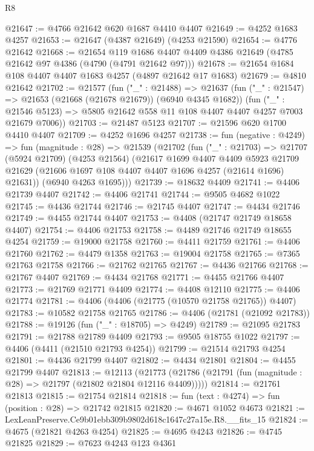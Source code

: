 \begin{lexlean}{R8}
\begin{coremodule}
@21647 := @4766 @21642 @620 @1687 @4410 @4407
@21649 := @4252 @1683 @4257
@21653 := @21647 (@4387 @21649) (@4253 @21590)
@21654 := @4776 @21642
@21668 := @21654
    @119
    @1686
    @4407
    @4409
    @4386
    @21649
    (@4785 @21642 @97 @4386 (@4790 (@4791 @21642 @97)))
@21678 := @21654 @1684 @108 @4407 @4407 @1683 @4257 (@4897 @21642 @17 @1683)
@21679 := @4810 @21642
@21702 := @21577
    (fun ("_" : @21488) =>
    @21637
      (fun ("_" : @21547) => @21653 (@21668 (@21678 @21679)) (@6940 @4345 @1682))
      (fun ("_" : @21546 @5123) => @5805 @21642 @558 @11 @108 @4407 @4407 @4257 @7003 @21679 @7006))
@21703 := @21487 @5123
@21707 := @21596 @620 @1700 @4410 @4407
@21709 := @4252 @1696 @4257
@21738 := fun (negative : @4249) =>
  fun (magnitude : @28) =>
  @21539
    (@21702
      (fun ("_" : @21703) =>
      @21707
        (@5924 @21709)
        (@4253 @21564)
        (@21617
          @1699
          @4407
          @4409
          @5923
          @21709
          @21629
          (@21606 @1697 @108 @4407 @4407 @1696 @4257 (@21614 @1696) @21631))
        (@6940 @4263 @1695)))
@21739 := @18632 @4409
@21741 := @4406 @21739 @4407
@21742 := @4406 @21741
@21744 := @9505 @4682 @1022
@21745 := @4436 @21744
@21746 := @21745 @4407
@21747 := @4434 @21746
@21749 := @4455 @21744 @4407
@21753 := @4408 (@21747 @21749 @18658 @4407)
@21754 := @4406 @21753
@21758 := @4489 @21746 @21749 @18655 @4254
@21759 := @19000 @21758
@21760 := @4411 @21759
@21761 := @4406 @21760
@21762 := @4479 @1358
@21763 := @19004 @21758
@21765 := @7365 @21763 @21758
@21766 := @21762 @21765
@21767 := @4436 @21766
@21768 := @21767 @4407
@21769 := @4434 @21768
@21771 := @4455 @21766 @4407
@21773 := @21769 @21771 @4409
@21774 := @4408 @12110
@21775 := @4406 @21774
@21781 := @4406 (@4406 (@21775 (@10570 @21758 @21765)) @4407)
@21783 := @10582 @21758 @21765
@21786 := @4406 (@21781 (@21092 @21783))
@21788 := @19126 (fun ("_" : @18705) => @4249)
@21789 := @21095 @21783
@21791 := @21788 @21789 @4409
@21793 := @9505 @18755 @1022
@21797 := @4406 (@4411 (@21510 @21793 @4254))
@21799 := @21514 @21793 @4254
@21801 := @4436 @21799 @4407
@21802 := @4434 @21801
@21804 := @4455 @21799 @4407
@21813 := @12113
    (@21773 (@21786 (@21791 (fun (magnitude : @28) => @21797 (@21802 @21804 @12116 @4409)))))
@21814 := @21761 @21813
@21815 := @21754 @21814
@21818 := fun (text : @4274) => fun (position : @28) => @21742 @21815
@21820 := @4671 @1052 @4673
@21821 := LexLeanPreserve.Ce9b01ebb309b9802d618c1647c27a15e.R8.__fits_15
@21824 := @4675 (@21821 @4263 @4254)
@21825 := @4695 @4243
@21826 := @4745 @21825
@21829 := @7623 @4243 @123 @4361

\end{coremodule}
\end{lexlean}

